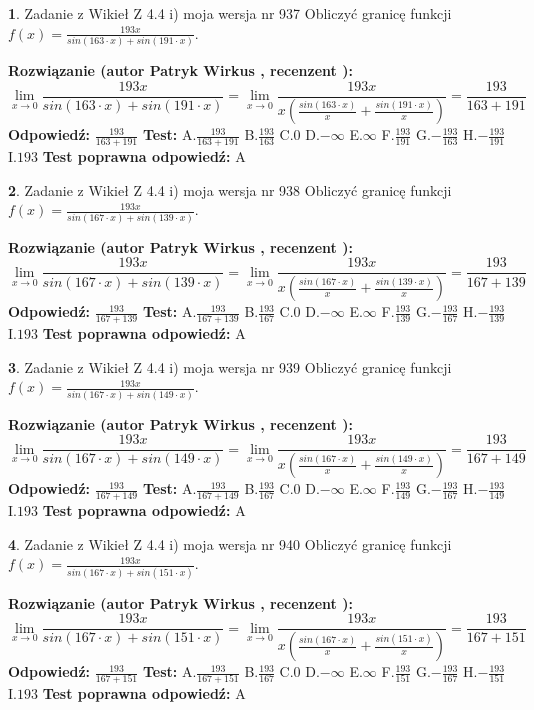 \documentclass[12pt, a4paper]{article}
\theoremstyle{definition} %
\newtheorem{zad}{}
\newcommand{\zadStart}[1]{\begin{zad}#1\newline}
\newcommand{\zadStop}{\end{zad}}
\newcommand{\rozwStart}[2]{\noindent \textbf{Rozwiązanie (autor #1 , recenzent #2): }\newline}
\newcommand{\rozwStop}{\newline}
\newcommand{\odpStart}{\noindent \textbf{Odpowiedź:}\newline}
\newcommand{\odpStop}{\newline}
\newcommand{\testStart}{\noindent \textbf{Test:}\newline}
\newcommand{\testStop}{\newline}
\newcommand{\kluczStart}{\noindent \textbf{Test poprawna odpowiedź:}\newline}
\newcommand{\kluczStop}{\newline}
\begin{document}
\zadStart{Zadanie z Wikieł Z 4.4 i) moja wersja nr 937}
Obliczyć granicę funkcji $f(x)=\frac{193x}{sin(163\cdot x) +sin(191\cdot x)}$.
\zadStop
\rozwStart{Patryk Wirkus}{}
$$\lim\limits_{x\to 0}\frac{193x}{sin(163\cdot x) +sin(191\cdot x)}=\lim\limits_{x\to 0}\frac{193x}{x(\frac{sin(163\cdot x)}{x}+\frac{sin(191\cdot x)}{x})}=\frac{193}{163+191}$$
\rozwStop
\odpStart
$\frac{193}{163+191}$
\odpStop
\testStart
A.$\frac{193}{163+191}$
B.$\frac{193}{163}$
C.$0$
D.$-\infty$
E.$\infty$
F.$\frac{193}{191}$
G.$-\frac{193}{163}$
H.$-\frac{193}{191}$
I.$193$
\testStop
\kluczStart
A
\kluczStop



\zadStart{Zadanie z Wikieł Z 4.4 i) moja wersja nr 938}
Obliczyć granicę funkcji $f(x)=\frac{193x}{sin(167\cdot x) +sin(139\cdot x)}$.
\zadStop
\rozwStart{Patryk Wirkus}{}
$$\lim\limits_{x\to 0}\frac{193x}{sin(167\cdot x) +sin(139\cdot x)}=\lim\limits_{x\to 0}\frac{193x}{x(\frac{sin(167\cdot x)}{x}+\frac{sin(139\cdot x)}{x})}=\frac{193}{167+139}$$
\rozwStop
\odpStart
$\frac{193}{167+139}$
\odpStop
\testStart
A.$\frac{193}{167+139}$
B.$\frac{193}{167}$
C.$0$
D.$-\infty$
E.$\infty$
F.$\frac{193}{139}$
G.$-\frac{193}{167}$
H.$-\frac{193}{139}$
I.$193$
\testStop
\kluczStart
A
\kluczStop



\zadStart{Zadanie z Wikieł Z 4.4 i) moja wersja nr 939}
Obliczyć granicę funkcji $f(x)=\frac{193x}{sin(167\cdot x) +sin(149\cdot x)}$.
\zadStop
\rozwStart{Patryk Wirkus}{}
$$\lim\limits_{x\to 0}\frac{193x}{sin(167\cdot x) +sin(149\cdot x)}=\lim\limits_{x\to 0}\frac{193x}{x(\frac{sin(167\cdot x)}{x}+\frac{sin(149\cdot x)}{x})}=\frac{193}{167+149}$$
\rozwStop
\odpStart
$\frac{193}{167+149}$
\odpStop
\testStart
A.$\frac{193}{167+149}$
B.$\frac{193}{167}$
C.$0$
D.$-\infty$
E.$\infty$
F.$\frac{193}{149}$
G.$-\frac{193}{167}$
H.$-\frac{193}{149}$
I.$193$
\testStop
\kluczStart
A
\kluczStop



\zadStart{Zadanie z Wikieł Z 4.4 i) moja wersja nr 940}
Obliczyć granicę funkcji $f(x)=\frac{193x}{sin(167\cdot x) +sin(151\cdot x)}$.
\zadStop
\rozwStart{Patryk Wirkus}{}
$$\lim\limits_{x\to 0}\frac{193x}{sin(167\cdot x) +sin(151\cdot x)}=\lim\limits_{x\to 0}\frac{193x}{x(\frac{sin(167\cdot x)}{x}+\frac{sin(151\cdot x)}{x})}=\frac{193}{167+151}$$
\rozwStop
\odpStart
$\frac{193}{167+151}$
\odpStop
\testStart
A.$\frac{193}{167+151}$
B.$\frac{193}{167}$
C.$0$
D.$-\infty$
E.$\infty$
F.$\frac{193}{151}$
G.$-\frac{193}{167}$
H.$-\frac{193}{151}$
I.$193$
\testStop
\kluczStart
A
\kluczStop
\end{document}
